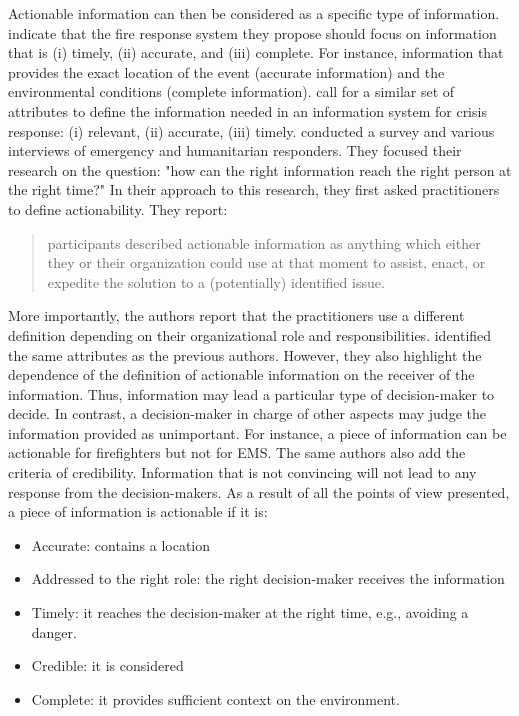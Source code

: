 Actionable information can then be considered as a specific type of information.
\textcite{yangDesignPrinciplesIntegrated2012} indicate that the fire response system they propose should focus on information that is (i) timely, (ii) accurate, and (iii) complete.
For instance, information that provides the exact location of the event (accurate information) and the environmental conditions (complete information).
\textcite{comesBringingStructureDisaster2015} call for a similar set of attributes to define the information needed in an information system for crisis response: (i) relevant, (ii) accurate, (iii) timely.
\textcite{zadeSituationalAwarenessActionability2018} conducted a survey and various interviews of emergency and humanitarian responders.
They focused their research on the question: "how can the right information reach the right person at the right time?"
In their approach to this research, they first asked practitioners to define actionability.
They report:
\blockquote{participants described actionable information as anything which either they or their organization could use at that moment to assist, enact, or expedite the solution to a (potentially) identified issue.}
More importantly, the authors report that the practitioners use a different definition depending on their organizational role and responsibilities.
\citeauthor{zadeSituationalAwarenessActionability2018} identified the same attributes as the previous authors.
However, they also highlight the dependence of the definition of actionable information on the receiver of the information.
Thus, information may lead a particular type of decision-maker to decide.
In contrast, a decision-maker in charge of other aspects may judge the information provided as unimportant.
For instance, a piece of information can be actionable for firefighters but not for EMS.
The same authors also add the criteria of credibility.
Information that is not convincing will not lead to any response from the decision-makers.
As a result of all the points of view presented, a piece of information is actionable if it is:

\begin{itemize}
    \item Accurate: contains a location
    \item Addressed to the right role: the right decision-maker receives the information
    \item Timely: it reaches the decision-maker at the right time, e.g., avoiding a danger.
    \item Credible: it is considered
    \item Complete: it provides sufficient context on the environment.
\end{itemize}

